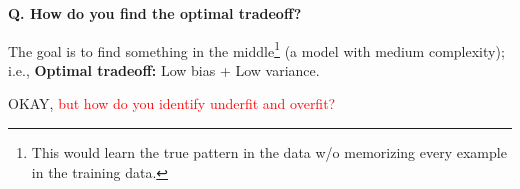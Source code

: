 \begin{frame}[fragile]{\textbf{Q. How do you find the optimal tradeoff?}}
  \begin{wideitemize}
    \item The goal is to find something in the middle\footnote{This would learn the
    true pattern in the data w/o memorizing every example in the training data.} (a
    model with medium complexity); i.e., \textbf{Optimal tradeoff:} Low bias + Low variance.
    \item OKAY, \textcolor{red}{but how do you identify underfit and overfit?}
  \end{wideitemize}


\end{frame}
